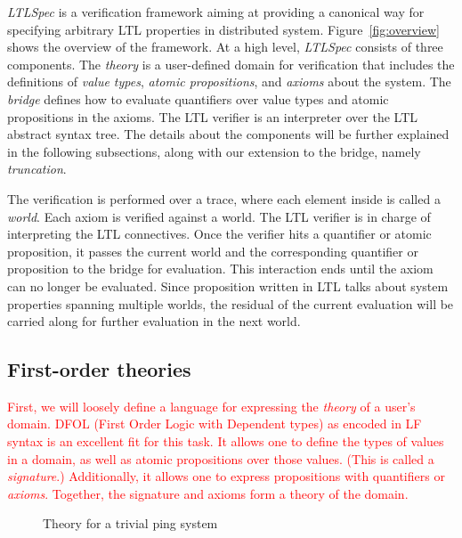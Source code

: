 \documentclass[format=acmsmall, nonacm=true, review=true, screen=true]{acmart}
\newcommand{\mycaption}[1]{\Description{#1}\caption{#1}}
\newcommand{\ltlspec}{\textit{LTLSpec}\xspace}
\newcommand{\red}[1]{\textcolor{red}{#1}}
\begin{document}
\ltlspec is a verification framework aiming at providing a canonical way for specifying arbitrary LTL properties in distributed system.
Figure~\ref{fig:overview} shows the overview of the framework.
At a high level, \ltlspec consists of three components.
The \textit{theory} is a user-defined domain for verification that includes the definitions of \textit{value types}, \textit{atomic propositions}, and \textit{axioms} about the system.
The \textit{bridge} defines how to evaluate quantifiers over value types and atomic propositions in the axioms.
The LTL verifier is an interpreter over the LTL abstract syntax tree.
The details about the components will be further explained in the following subsections, along with our extension to the bridge, namely \textit{truncation}.

The verification is performed over a trace, where each element inside is called a \textit{world}.
Each axiom is verified against a world. The LTL verifier is in charge of interpreting the LTL connectives.
Once the verifier hits a quantifier or atomic proposition, it passes the current world and the corresponding quantifier or proposition to the bridge for evaluation.
This interaction ends until the axiom can no longer be evaluated.
Since proposition written in LTL talks about system properties spanning multiple worlds, the residual of the current evaluation will be carried along for further evaluation in the next world.


\subsection{First-order theories}
\label{subsec:theory}

\red{
  First, we will loosely define a language for expressing the \textit{theory} of a user’s domain.
  DFOL (First Order Logic with Dependent types) as encoded in LF syntax \cite{hutchison_first-order_2006} is an excellent fit for this task. It allows one to define the types of values in a domain, as well as atomic propositions over those values. (This is called a \textit{signature}.)
  Additionally, it allows one to express propositions with quantifiers or \textit{axioms}. Together, the signature and axioms form a theory of the domain.
}

\begin{figure}[h]
  {
    \fontsize{10}{12}\selectfont
    
  }
  \mycaption{Theory for a trivial ping system}
  \label{fig:ping-theory}
\end{figure}
\end{document}
